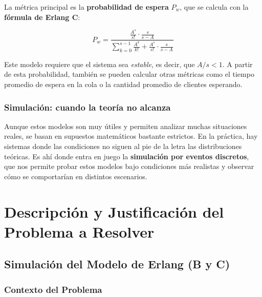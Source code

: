 \documentclass{article}
\begin{document}
La métrica principal es la \textbf{probabilidad de espera} \( P_w \), que se calcula con la \textbf{fórmula de Erlang C}:

\begin{equation}
P_w = \frac{\frac{A^s}{s!} \cdot \frac{s}{s - A}}{\sum_{k=0}^{s-1} \frac{A^k}{k!} + \frac{A^s}{s!} \cdot \frac{s}{s - A}}
\end{equation}

Este modelo requiere que el sistema sea \textit{estable}, es decir, que \( A/s < 1 \). A partir de esta probabilidad, también se pueden calcular otras métricas como el tiempo promedio de espera en la cola o la cantidad promedio de clientes esperando.

\subsubsection*{Simulación: cuando la teoría no alcanza}

Aunque estos modelos son muy útiles y permiten analizar muchas situaciones reales, se basan en supuestos matemáticos bastante estrictos. En la práctica, hay sistemas donde las condiciones no siguen al pie de la letra las distribuciones teóricas. Es ahí donde entra en juego la \textbf{simulación por eventos discretos}, que nos permite probar estos modelos bajo condiciones más realistas y observar cómo se comportarían en distintos escenarios.



\section{Descripción y Justificación del Problema a Resolver}\label{sec:descr}


\subsection{Simulación del Modelo de Erlang (B y C)}\label{subsec:erlang}

\subsubsection{Contexto del Problema}
\end{document}
